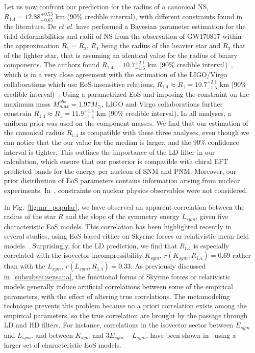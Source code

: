 Let us now confront our prediction for the radius of a canonical NS,
$R_{1.4}=12.88_{-0.65}^{+0.53}$ km ($90\%$ credible interval), with different 
constraints found in the literature.
De \textit{et al.} have performed a Bayesian parameter estimation for the tidal
deformabilities and radii of NS from the observation of GW170817 within the
approximation $R_1 = R_2$, $R_1$ being the radius of the heavier star and 
$R_2$ that of the lighter star, that is assuming an identical value for the 
radius of binary components. 
The authors found $R_{1.4} = 10.7_{-1.6}^{+2.1}$ km ($90\%$ 
credible interval)~\cite{De2018}, which is in a very close agreement with the 
estimation of the LIGO/Virgo collaborations which use EoS-insensitive 
relations, $R_{1.4} \approx R_1 = 10.7_{-1.5}^{+2.1}$ km ($90\%$ credible
interval)~\cite{GW1}. Using a parametrized EoS and imposing the constraint on
the maximum mass $M_{max}^{obs}=1.97M_\odot$, LIGO and Virgo collaborations 
further constrain $R_{1.4} \approx R_1 = 11.9_{-1.4}^{+1.4}$ km ($90\%$ 
credible interval). In all analyses, a uniform prior was used on the component 
masses. 
We find that our estimation of the canonical radius $R_{1.4}$ is 
compatible with these three analyses, even though we can notice that the our
value for the median is larger, and the $90\%$ confidence interval is 
tighter. This outlines the importance of the LD filter in our calculation, 
which ensure that our posterior is compatible with chiral EFT predicted bands 
for the energy per nucleon of SNM and PNM. Moreover, our prior distribution of 
EoS parameters contains information arising from nuclear experiments.
In~\cite{De2018,GW1}, constraints on nuclear physics observables were not 
considered.

In Fig.~\ref{fig:mr_popular}, we have observed an apparent correlation between 
the radius of the star $R$ and the slope of the symmetry energy $L_{sym}$, 
given five characteristic EoS models. This correlation has 
been highlighted recently in several studies, using EoS based either on
Skyrme forces or relativistic mean-field models~\cite{Alam2016,Ji2019,Hu2020}. 
Surprisingly, for the LD prediction, we find that $R_{1.4}$ is especially 
correlated with the isovector incompressibility $K_{sym}$, 
$r(K_{sym},R_{1.4})=0.69$ rather than with the $L_{sym}$, 
$r(L_{sym},R_{1.4})=0.33$. As previously discussed in~\ref{subsubsec:sensana}, 
the functional forms of Skyrme forces or relativistic models generally induce 
artificial correlations between some of the empirical parameters, with the 
effect of altering true correlations. The metamodeling technique prevents this 
problem because no a priori correlation exists among the empirical parameters, 
so the true correlation are brought by the passage through LD and HD filters. 
For instance, correlations in the isovector sector between $E_{sym}$ and 
$L_{sym}$, and between $K_{sym}$ and $3E_{sym}-L_{sym}$, have been shown 
in~\cite{Mondal2017,Margueron2019} using a larger set of characteristic EoS
models.

